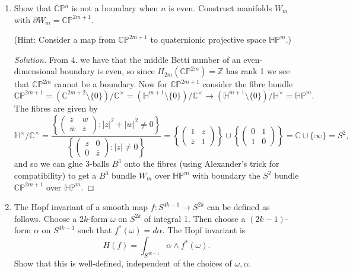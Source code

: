 \documentclass{article}
\theoremstyle{definition}
\newcommand{\conj}[1]{\overline{#1}}
\newcommand{\CP}{\mathbb{CP}}
\newcommand{\HP}{\mathbb{HP}}
\renewcommand{\H}{\mathbb{H}}
\newcommand{\Z}{\mathbb{Z}}
\newcommand{\C}{\mathbb{C}}
\begin{document}
\begin{enumerate}
    \item Show that $\CP^n$ is not a boundary when $n$ is even. Construct
        manifolds $W_m$ with $\partial W_m=\CP^{2m+1}$.

        (Hint: Consider a map from $\CP^{2m+1}$ to quaternionic projective space
        $\HP^m$.)

        \begin{proof}[Solution]
            From 4. we have that the middle Betti number of an even-dimensional
            boundary is even, so since $H_{2m}(\CP^{2m})=\Z$ has rank 1 we see
            that $\CP^{2m}$ cannot be a boundary. Now for $\CP^{2m+1}$ consider
            the fibre bundle
            \begin{equation*}
                \CP^{2m+1}
                    = (\C^{2m+2}\setminus\{0\})/\C^\times
                    = (\H^{m+1}\setminus\{0\})/\C^\times
                    \to (\H^{m+1}\setminus\{0\})/\H^\times
                    = \HP^m.
            \end{equation*}
            The fibres are given by 
            \begin{equation*}
                \H^\times/\C^\times
                = \frac{\left\{\begin{pmatrix}
                    z & w \\ \conj w & \conj z
                \end{pmatrix}:|z|^2+|w|^2\ne0\right\}}{\left\{\begin{pmatrix}
                    z & 0 \\ 0 & \conj z
                \end{pmatrix}:|z|\ne0\right\}}
                = \left\{\begin{pmatrix}
                    1 & z \\ \conj z & 1
                \end{pmatrix}\right\}\cup\left\{\begin{pmatrix}
                    0 & 1 \\ 1 & 0
                \end{pmatrix}\right\} = \C\cup\{\infty\} = S^2,
            \end{equation*}
            and so we can glue 3-balls $B^3$ onto the fibres (using Alexander's
            trick for compatibility) to get a $B^3$ bundle $W_m$ over $\HP^m$
            with boundary the $S^2$ bundle $\CP^{2m+1}$ over $\HP^m$.
        \end{proof}

    \item The Hopf invariant of a smooth map $f:S^{4k-1}\to S^{2k}$ can be
        defined as follows. Choose a $2k$-form $\omega$ on $S^{2k}$ of integral
        1. Then choose a $(2k-1)$-form $\alpha$ on $S^{4k-1}$ such that
        $f^*(\omega)=d\alpha$. The Hopf invariant is
        \begin{equation*}
            H(f) = \int_{S^{4k-1}}\alpha\wedge f^*(\omega).
        \end{equation*}
        Show that this is well-defined, independent of the choices of
        $\omega,\alpha$.


\end{enumerate}
\end{document}
